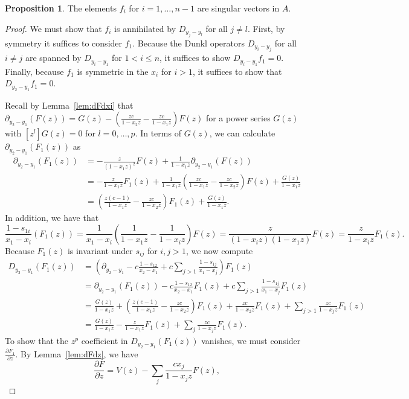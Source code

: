 \documentclass{elsarticle}
\numberwithin{equation}{section}
\theoremstyle{definition}
\newtheorem{proposition}[theorem]{Proposition}
\begin{document}
\begin{proposition}\label{prop:ann} 
The elements $f_i$ for $i=1,\dots,n-1$ are singular vectors in $A$.
\end{proposition}
\begin{proof}
We must show that $f_i$ is annihilated by $D_{y_j - y_l}$ for all $j \ne l$.  First, by symmetry it suffices to consider $f_1$.  Because the Dunkl operators $D_{y_i-y_j}$ for all $i \ne j$ are spanned by $D_{y_i-y_1}$ for $1< i \le n$, it suffices to show $D_{y_i - y_1} f_1 = 0$.  Finally, because $f_1$ is symmetric in the $x_i$ for $i > 1$, it suffices to show that $D_{y_2 - y_1} f_1 = 0$.

Recall by Lemma~\ref{lem:dFdxi} that $\partial_{y_2-y_1}(F(z))= G(z) - \left(\frac{zc}{1-x_2z}-\frac{zc}{1-x_1z}\right)F(z)$ for a power series $G(z)$ with $[z^l]G(z)=0$ for $l=0,\dots,p$. In terms of $G(z)$, we can calculate $\partial_{y_2-y_1}(F_1(z))$ as
\begin{align*}
\partial_{y_2-y_1}(F_1(z))
&=-\frac{z}{(1-x_1z)^2}F(z)+\frac{1}{1-x_1z}\partial_{y_2-y_1}(F(z))\\
&=-\frac{z}{1-x_1z}F_1(z)+\frac{1}{1-x_1z}\left(\frac{zc}{1-x_1z}-\frac{zc}{1-x_2z}\right)F(z)+\frac{G(z)}{1-x_1z}\\
&=\left(\frac{z(c-1)}{1-x_1z}-\frac{zc}{1-x_2z}\right)F_1(z)+\frac{G(z)}{1-x_1z}.
\end{align*}
In addition, we have that 
\[
\frac{1-s_{1i}}{x_1-x_i}(F_1(z))
=\frac{1}{x_1-x_i}\left(\frac{1}{1-x_1z}-\frac{1}{1-x_iz}\right)F(z)=\frac{z}{(1-x_iz)(1-x_1z)}F(z)=\frac{z}{1-x_iz}F_1(z).
\]
Because $F_1(z)$ is invariant under $s_{ij}$ for $i,j > 1$, we now compute
\begin{align*}
D_{y_2-y_1}(F_1(z))&=\left(\partial_{y_2-y_1}-c\frac{1-s_{12}}{x_2-x_1}+c\sum_{j > 1} \frac{1-s_{1j}}{x_1-x_j}\right)F_1(z)\\
&=\partial_{y_2-y_1}(F_1(z))-c\frac{1-s_{12}}{x_2-x_1}F_1(z)+c\sum_{j > 1} \frac{1-s_{1j}}{x_1-x_j}F_1(z)\\
&=\frac{G(z)}{1-x_1z}+\left(\frac{z(c-1)}{1-x_1z}-\frac{zc}{1-x_2z}\right)F_1(z)+\frac{zc}{1-x_2z}F_1(z)+\sum_{j > 1} \frac{zc}{1-x_jz}F_1(z)\\
&=\frac{G(z)}{1-x_1z}-\frac{z}{1-x_1z}F_1(z)+\sum_{j} \frac{zc}{1-x_jz}F_1(z).
\end{align*}
To show that the $z^p$ coefficient in $D_{y_2-y_1}(F_1(z))$ vanishes, we must consider $\frac{\partial F_1}{\partial z}$.  By Lemma~\ref{lem:dFdz}, we have
\[
\frac{\partial F}{\partial z}=V(z) - \sum_j \frac{cx_j}{1-x_jz}F(z),
\]
\end{proof}
\end{document}
